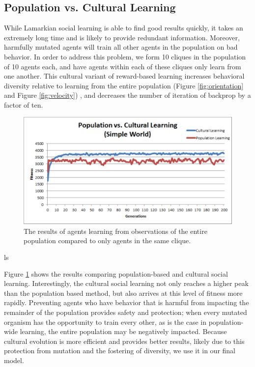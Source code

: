 \documentclass{acm_proc_article-sp}
\begin{document}
\subsection*{Population vs. Cultural Learning}
While Lamarkian social learning is able to find good results quickly, it takes an extremely long time and is likely to provide redundant information.  Moreover, harmfully mutated agents will train all other agents in the population on bad behavior.  In order to address this problem, we form 10 cliques in the population of 10 agents each, and have agents within each of these cliques only learn from one another.  This cultural variant of reward-based learning increases behavioral diversity relative to learning from the entire population (Figure \ref{fig:orientation} and Figure \ref{fig:velocity}) , and   decreases the number of iteration of backprop by a factor of ten.

\begin{figure}
  \centering
    \includegraphics[scale=.35]{population_vs_cultural_learning.pdf}
  \caption{The results of agents learning from observations of the entire population compared to only agents in the same clique.}
  \label{fig:population-social}
\end{figure}ls

Figure \ref{fig:population-social} shows the results comparing population-based and cultural social learning. Interestingly, the cultural social learning not only reaches a higher peak than the population based method, but also arrives at this level of fitness more rapidly.  Preventing agents who have behavior that is harmful from impacting the remainder of the population provides safety and protection; when every mutated organism has the opportunity to train every other, as is the case in population-wide learning, the entire population may be negatively impacted.  Because cultural evolution is more efficient and provides better results, likely due to this protection from mutation and the fostering of diversity, we use it in our final model.
\end{document}
